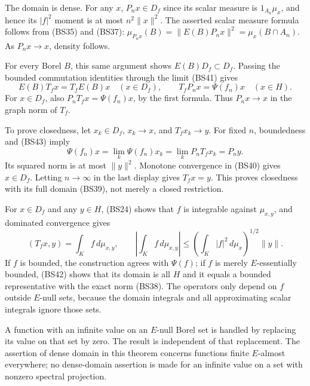 \documentclass[
  11pt,
]{article}
\begin{document}
The domain is dense. For any \(x\), \(P_nx\in D_f\) since its scalar
measure is \(1_{A_n}\mu_x\), and hence its \(|f|^2\) moment is at most
\(n^2\|x\|^2\). The asserted scalar measure formula follows from (BS35)
and (BS37): \(\mu_{P_nx}(B)=\|E(B)P_nx\|^2=\mu_x(B\cap A_n)\). As
\(P_nx\to x\), density follows.

For every Borel \(B\), this same argument shows \(E(B)D_f\subset D_f\).
Passing the bounded commutation identities through the limit (BS41)
gives \[
 E(B)T_fx=T_fE(B)x\quad(x\in D_f),
 \qquad T_fP_nx=\Psi(f_n)x\quad(x\in H).
 \tag{BS43}
\] For \(x\in D_f\), also \(P_nT_fx=\Psi(f_n)x\), by the first formula.
Thus \(P_nx\to x\) in the graph norm of \(T_f\).

To prove closedness, let \(x_k\in D_f\), \(x_k\to x\), and
\(T_fx_k\to y\). For fixed \(n\), boundedness and (BS43) imply \[
 \Psi(f_n)x=\lim_k\Psi(f_n)x_k
           =\lim_k P_nT_fx_k=P_ny.
\] Its squared norm is at most \(\|y\|^2\). Monotone convergence in
(BS40) gives \(x\in D_f\). Letting \(n\to\infty\) in the last display
gives \(T_fx=y\). This proves closedness with its full domain (BS39),
not merely a closed restriction.

For \(x\in D_f\) and any \(y\in H\), (BS24) shows that \(f\) is
integrable against \(\mu_{x,y}\), and dominated convergence gives \[
 (T_fx,y)=\int_K f\,d\mu_{x,y},\qquad
 \left|\int_Kf\,d\mu_{x,y}\right|
 \leq\left(\int_K|f|^2\,d\mu_x\right)^{1/2}\|y\|.
 \tag{BS44}
\] If \(f\) is bounded, the construction agrees with \(\Psi(f)\); if
\(f\) is merely \(E\)-essentially bounded, (BS42) shows that its domain
is all \(H\) and it equals a bounded representative with the exact norm
(BS38). The operators only depend on \(f\) outside \(E\)-null sets,
because the domain integrals and all approximating scalar integrals
ignore those sets.

A function with an infinite value on an \(E\)-null Borel set is handled
by replacing its value on that set by zero. The result is independent of
that replacement. The assertion of dense domain in this theorem concerns
functions finite \(E\)-almost everywhere; no dense-domain assertion is
made for an infinite value on a set with nonzero spectral projection.
\end{document}
